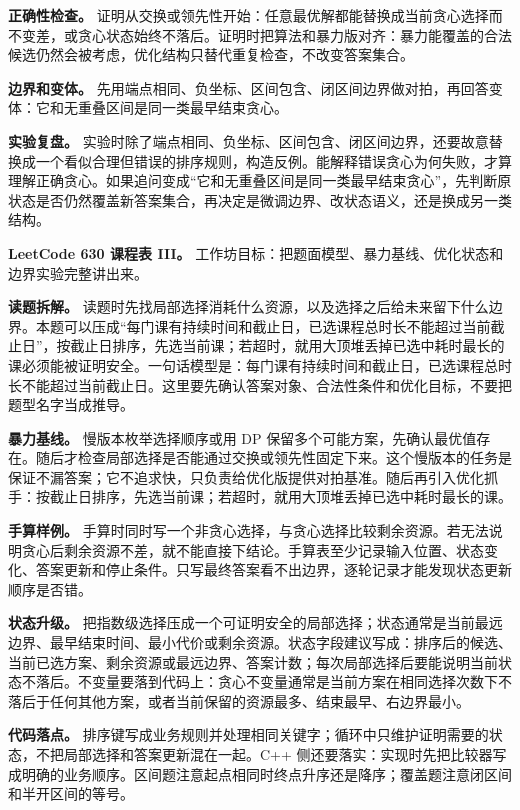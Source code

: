 \textbf{正确性检查。} 证明从交换或领先性开始：任意最优解都能替换成当前贪心选择而不变差，或贪心状态始终不落后。证明时把算法和暴力版对齐：暴力能覆盖的合法候选仍然会被考虑，优化结构只替代重复检查，不改变答案集合。

\textbf{边界和变体。} 先用端点相同、负坐标、区间包含、闭区间边界做对拍，再回答变体：它和无重叠区间是同一类最早结束贪心。

\textbf{实验复盘。} 实验时除了端点相同、负坐标、区间包含、闭区间边界，还要故意替换成一个看似合理但错误的排序规则，构造反例。能解释错误贪心为何失败，才算理解正确贪心。如果追问变成“它和无重叠区间是同一类最早结束贪心”，先判断原状态是否仍然覆盖新答案集合，再决定是微调边界、改状态语义，还是换成另一类结构。

\noindent\textbf{LeetCode 630 课程表 III。} 工作坊目标：把题面模型、暴力基线、优化状态和边界实验完整讲出来。

\textbf{读题拆解。} 读题时先找局部选择消耗什么资源，以及选择之后给未来留下什么边界。本题可以压成“每门课有持续时间和截止日，已选课程总时长不能超过当前截止日”，按截止日排序，先选当前课；若超时，就用大顶堆丢掉已选中耗时最长的课必须能被证明安全。一句话模型是：每门课有持续时间和截止日，已选课程总时长不能超过当前截止日。这里要先确认答案对象、合法性条件和优化目标，不要把题型名字当成推导。

\textbf{暴力基线。} 慢版本枚举选择顺序或用 DP 保留多个可能方案，先确认最优值存在。随后才检查局部选择是否能通过交换或领先性固定下来。这个慢版本的任务是保证不漏答案；它不追求快，只负责给优化版提供对拍基准。随后再引入优化抓手：按截止日排序，先选当前课；若超时，就用大顶堆丢掉已选中耗时最长的课。

\textbf{手算样例。} 手算时同时写一个非贪心选择，与贪心选择比较剩余资源。若无法说明贪心后剩余资源不差，就不能直接下结论。手算表至少记录输入位置、状态变化、答案更新和停止条件。只写最终答案看不出边界，逐轮记录才能发现状态更新顺序是否错。

\textbf{状态升级。} 把指数级选择压成一个可证明安全的局部选择；状态通常是当前最远边界、最早结束时间、最小代价或剩余资源。状态字段建议写成：排序后的候选、当前已选方案、剩余资源或最远边界、答案计数；每次局部选择后要能说明当前状态不落后。不变量要落到代码上：贪心不变量通常是当前方案在相同选择次数下不落后于任何其他方案，或者当前保留的资源最多、结束最早、右边界最小。

\textbf{代码落点。} 排序键写成业务规则并处理相同关键字；循环中只维护证明需要的状态，不把局部选择和答案更新混在一起。C++ 侧还要落实：实现时先把比较器写成明确的业务顺序。区间题注意起点相同时终点升序还是降序；覆盖题注意闭区间和半开区间的等号。

